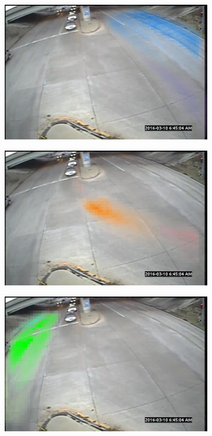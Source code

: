 \begin{figure}
    \begin{subfigure}{0.32\linewidth}
        \includegraphics[width=\linewidth]{./img/scene_learning/topics/topic-2.jpg}
    \end{subfigure}%
    \begin{subfigure}{0.32\linewidth}
        \includegraphics[width=\linewidth]{./img/scene_learning/topics/topic-3.jpg}
    \end{subfigure}%
    \begin{subfigure}{0.32\linewidth}
        \includegraphics[width=\linewidth]{./img/scene_learning/topics/topic-0.jpg}
    \end{subfigure}%


\end{figure}
